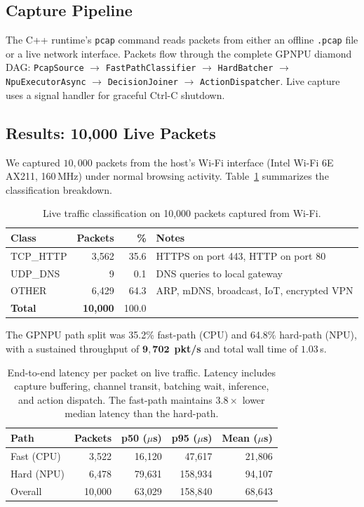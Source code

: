 \documentclass[11pt,a4paper,twoside]{article}
\theoremstyle{definition}
\theoremstyle{remark}
\begin{document}
\subsection{Capture Pipeline}

The C++ runtime's \texttt{pcap} command reads packets from either an offline \texttt{.pcap} file or a live network interface. Packets flow through the complete GPNPU diamond DAG: \texttt{PcapSource} $\to$ \texttt{FastPathClassifier} $\to$ \texttt{HardBatcher} $\to$ \texttt{NpuExecutorAsync} $\to$ \texttt{DecisionJoiner} $\to$ \texttt{ActionDispatcher}. Live capture uses a signal handler for graceful Ctrl-C shutdown.

\subsection{Results: 10{,}000 Live Packets}

We captured $10{,}000$ packets from the host's Wi-Fi interface (Intel Wi-Fi 6E AX211, 160\,MHz) under normal browsing activity. Table~\ref{tab:live-results} summarizes the classification breakdown.

\begin{table}[H]
\centering
\small
\begin{tabular}{lrrl}
\toprule
\textbf{Class} & \textbf{Packets} & \textbf{\%} & \textbf{Notes} \\
\midrule
TCP\_HTTP & 3{,}562 & 35.6 & HTTPS on port 443, HTTP on port 80 \\
UDP\_DNS  & 9      & 0.1  & DNS queries to local gateway \\
OTHER     & 6{,}429 & 64.3 & ARP, mDNS, broadcast, IoT, encrypted VPN \\
\midrule
\textbf{Total} & \textbf{10{,}000} & 100.0 & \\
\bottomrule
\end{tabular}
\caption{Live traffic classification on 10{,}000 packets captured from Wi-Fi.}
\label{tab:live-results}
\end{table}

\noindent The GPNPU path split was 35.2\% fast-path (CPU) and 64.8\% hard-path (NPU), with a sustained throughput of $\mathbf{9{,}702}$~\textbf{pkt/s} and total wall time of $1.03$\,s.

\begin{table}[H]
\centering
\small
\begin{tabular}{lrrrr}
\toprule
\textbf{Path} & \textbf{Packets} & \textbf{p50 ($\mu$s)} & \textbf{p95 ($\mu$s)} & \textbf{Mean ($\mu$s)} \\
\midrule
Fast (CPU)  & 3{,}522  & 16{,}120  & 47{,}617  & 21{,}806 \\
Hard (NPU)  & 6{,}478  & 79{,}631  & 158{,}934 & 94{,}107 \\
Overall     & 10{,}000 & 63{,}029  & 158{,}840 & 68{,}643 \\
\bottomrule
\end{tabular}
\caption{End-to-end latency per packet on live traffic. Latency includes capture buffering, channel transit, batching wait, inference, and action dispatch. The fast-path maintains $3.8\times$ lower median latency than the hard-path.}
\label{tab:live-latency}
\end{table}
\end{document}
